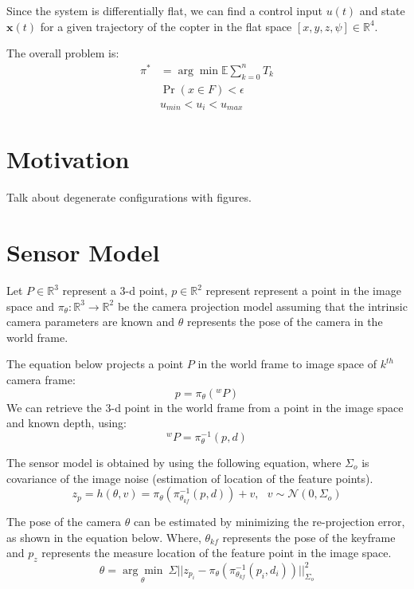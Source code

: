 \documentclass[conference]{IEEEtran}
\begin{document}
Since the system is differentially flat, we can find a control input $u(t)$ and state $\boldsymbol{x}(t)$ for a given trajectory of the copter in the flat space $[x, y, z, \psi] \in \mathbb{R}^4$.

 The overall problem is:
\begin{align}
\pi^{*} &= \arg\min \mathbb{E}\sum_{k=0}^n T_k\\
\nonumber & \Pr(x\in F) < \epsilon \\
\nonumber & u_{min} < u_i < u_{max}
\end{align}

\section{Motivation}
Talk about degenerate configurations with figures.

\section{Sensor Model}

Let $P \in \mathbb{R}^{3}$ represent a 3-d point, $p \in \mathbb{R}^2$ represent represent a point in the image space and $\pi_\theta:\mathbb{R}^3\to\mathbb{R}^2$ be the camera projection model assuming that the intrinsic camera parameters are known and $\theta$ represents the pose of the camera in the world frame.

The equation below projects a point $P$ in the world frame to image space of $k^{th}$ camera frame:
\begin{equation} p=\pi_\theta(^{w}P) \end{equation}
We can retrieve the 3-d point in the world frame from a point in the image space and known depth, using: 
\begin{equation} ^{w}P=\pi^{-1}_\theta(p,d) \end{equation}

The sensor model is obtained by using the following equation, where $\Sigma_o$ is covariance of the image noise (estimation of location of the feature points).
\begin{equation}
     z_p = h(\theta,v)=
     \pi_\theta(\pi^{-1}_{\theta_{kf}}(p,d)) + v,~~~ v\sim \mathcal{N}(0,\Sigma_{o})
     \label{eq:ObsModel}
\end{equation}


The pose of the camera $\theta$ can be estimated by minimizing the re-projection error, as shown in the equation below. Where, $\theta_{kf}$ represents the pose of the keyframe and $p_z$ represents the measure location of the feature point in the image space.
\begin{equation}
     \theta = \underset{\theta}{\arg\min}~\Sigma ||z_{p_i} - \pi_\theta(\pi^{-1}_{\theta_{kf}}(p_i,d_i))||^2_{\Sigma_o}
\end{equation}
\end{document}
